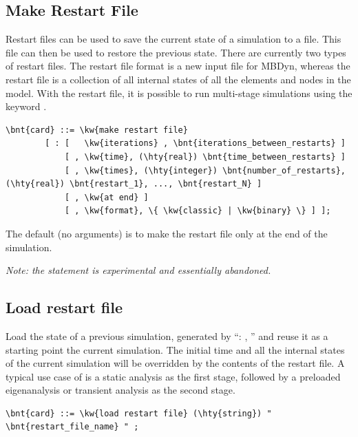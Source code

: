 \subsection{Make Restart File}
Restart files can be used to save the current state of a simulation to a file.
This file can then be used to restore the previous state. There are currently two types of restart files.
The  restart file format is a new input file for MBDyn, whereas the  restart file is a collection
of all internal states of all the elements and nodes in the model. With the  restart file, it is possible
to run multi-stage simulations using the keyword .
\begin{Verbatim}[commandchars=\\\{\}]
    \bnt{card} ::= \kw{make restart file}
        [ : [   \kw{iterations} , \bnt{iterations_between_restarts} ]
            [ , \kw{time}, (\hty{real}) \bnt{time_between_restarts} ]
            [ , \kw{times}, (\hty{integer}) \bnt{number_of_restarts}, (\hty{real}) \bnt{restart_1}, ..., \bnt{restart_N} ]
            [ , \kw{at end} ]
            [ , \kw{format}, \{ \kw{classic} | \kw{binary} \} ] ];
\end{Verbatim}
The default (no arguments) is to make the  restart file only at the end of
the simulation.

\emph{Note: the  statement is experimental and essentially abandoned.}

\subsection{Load restart file}
Load the state of a previous simulation, generated by ``: , ''
and reuse it as a starting point the current simulation. The initial time and all the internal states
of the current simulation will be overridden by the contents of the restart file. A typical use case of
 is a static analysis as the first stage, followed by a preloaded eigenanalysis
or transient analysis as the second stage.
\begin{Verbatim}[commandchars=\\\{\}]
    \bnt{card} ::= \kw{load restart file} (\hty{string}) " \bnt{restart_file_name} " ;        
\end{Verbatim}


